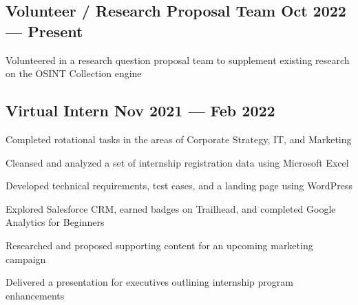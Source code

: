 \subsection{{Volunteer / Research Proposal Team \hfill Oct 2022 --- Present}}
\begin{zitemize}
\item Volunteered in a research question proposal team to supplement existing research on the OSINT Collection engine


\end{zitemize}

\subsection{{Virtual Intern \hfill Nov 2021 --- Feb 2022}}
\begin{zitemize}
\item Completed rotational tasks in the areas of Corporate Strategy, IT, and Marketing
\item Cleansed and analyzed a set of internship registration data using Microsoft Excel
\item Developed technical requirements, test cases, and a landing page using WordPress
\item Explored Salesforce CRM, earned badges on Trailhead, and completed Google Analytics for Beginners
\item Researched and proposed supporting content for an upcoming marketing campaign
\item Delivered a presentation for executives outlining internship program enhancements

\end{zitemize}

